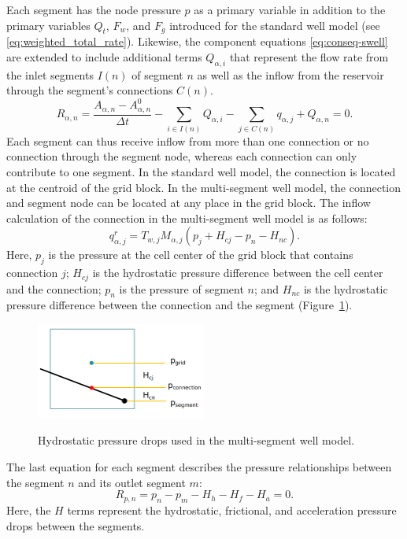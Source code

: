Each segment has the node pressure $p$ as a primary variable in addition to the primary
variables $Q_t$, $F_w$, and $F_g$ introduced for the standard well model (see
\eqref{eq:weighted_total_rate}). Likewise, the component equations \eqref{eq:conseq-swell}
are extended to include additional terms $Q_{\alpha, i}$ that
represent the flow rate from the inlet segments $I(n)$ of segment $n$ as
well as the inflow from the reservoir through the segment's
connections $C(n)$.
\begin{equation}
R_{\alpha,n} = \frac{A_{\alpha, n} - A_{\alpha, n}^0}{\Delta t} - \sum_{i\in I(n)} Q_{\alpha, i} - \sum_{j\in C(n)}
q_{\alpha, j} + Q_{\alpha, n} = 0.
\end{equation}
Each segment can thus receive inflow from more than one connection or no
connection through the segment node, whereas each connection can only contribute to one
segment. In the standard well model, the connection is located at the centroid of the
grid block. In the multi-segment well model, the connection and
segment node can be {\revised located at} any place in the grid block. The inflow calculation of
the connection in the multi-segment
well model is as follows:
\begin{equation}
q_{\alpha, j}^r = T_{w,j} M_{\alpha, j} (p_{j} + H_{cj} - p_n - H_{nc}).
\label{eq:msw_inflow}
\end{equation}
Here, $p_{j}$ is the pressure at the cell center of the grid block that contains
connection $j$; $H_{cj}$ is the hydrostatic pressure difference between the cell
center and the connection; $p_n$ is the pressure of segment $n$; and $H_{nc}$ is the
hydrostatic pressure difference between the connection and the segment
(Figure~\ref{fig:msw_inflow}).

\begin{figure}
\centering
{\includegraphics[width=0.5\textwidth]{figures/msw/inflow}}
\caption{Hydrostatic pressure drops used in the multi-segment well
model.}
\label{fig:msw_inflow}
\end{figure}

The last equation for each segment describes the pressure relationships between the
segment $n$ and its outlet segment $m$:
\begin{equation}
  R_{p, n} = p_{n} - p_{m} - H_h - H_f - H_a = 0.
\end{equation}
Here, the $H$ terms represent the hydrostatic, frictional, and acceleration pressure drops
between the segments.

